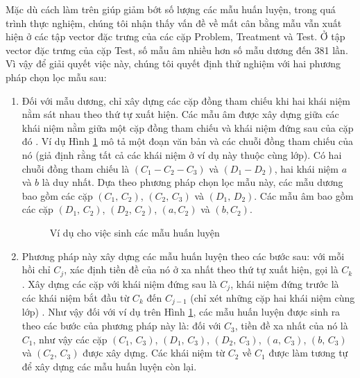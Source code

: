 Mặc dù cách làm trên giúp giảm bớt số lượng các mẫu huấn luyện, trong quá trình thực nghiệm, chúng tôi nhận thấy vấn đề về mất cân bằng mẫu vẫn xuất hiện ở các tập vector đặc trưng của các cặp Problem, Treatment và Test. Ở tập vector đặc trưng của cặp Test, số mẫu âm nhiều hơn số mẫu dương đến 381 lần. Vì vậy để giải quyết việc này, chúng tôi quyết định thử nghiệm với hai phương pháp chọn lọc mẫu sau:
\begin{enumerate}
\item Đối với mẫu dương, chỉ xây dựng các cặp đồng tham chiếu khi hai khái niệm nằm sát nhau theo thứ tự xuất hiện. Các mẫu âm được xây dựng giữa các khái niệm nằm giữa một cặp đồng tham chiếu và khái niệm đứng sau của cặp đó \cite{Soon2001}. Ví dụ Hình \ref{fig:insgen-eg} mô tả một đoạn văn bản và các chuỗi đồng tham chiếu của nó (giả định rằng tất cả các khái niệm ở ví dụ này thuộc cùng lớp). Có hai chuỗi đồng tham chiếu là $(C_1-C_2-C_3)$ và $(D_1-D_2)$, hai khái niệm $a$ và $b$ là duy nhất. Dựa theo phương pháp chọn lọc mẫu này, các mẫu dương bao gồm các cặp $(C_1,\,C_2)$, $(C_2,\,C_3)$ và $(D_1,\,D_2)$. Các mẫu âm bao gồm các cặp $(D_1,\,C_2)$, $(D_2,\,C_2)$, $(a,C_2)$ và $(b,C_2)$.

\begin{figure}[ht]
\centering
{}
\caption{Ví dụ cho việc sinh các mẫu huấn luyện\label{fig:insgen-eg}}
\end{figure}

\item Phương pháp này xây dựng các mẫu huấn luyện theo các bước sau: với mỗi hồi chỉ $C_j$, xác định tiền đề của nó ở xa nhất theo thứ tự xuất hiện, gọi là $C_k$. Xây dựng các cặp với khái niệm đứng sau là $C_j$, khái niệm đứng trước là các khái niệm bắt đầu từ $C_k$ đến $C_{j-1}$ (chỉ xét những cặp hai khái niệm cùng lớp) \cite{VincentNg2002b}. Như vậy đối với ví dụ trên Hình \ref{fig:insgen-eg}, các mẫu  huấn luyện được sinh ra theo các bước của phương pháp này là: đối với $C_3$, tiền đề xa nhất của nó là $C_1$, như vậy các cặp $(C_1,\,C_3)$, $(D_1,\,C_3)$, $(D_2,\,C_3)$, $(a,\,C_3)$, $(b,\,C_3)$ và $(C_2,\,C_3)$ được xây dựng. Các khái niệm từ $C_2$ về $C_1$ được làm tương tự để xây dựng các mẫu huấn luyện còn lại.
\end{enumerate}

